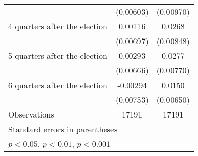 \begin{table}[htbp]
\begin{tabular}{l*{2}{c}}
                    &   (0.00603)         &   (0.00970)         \\
[1em]
 4 quarters after the election&     0.00116         &      0.0268\sym{**} \\
                    &   (0.00697)         &   (0.00848)         \\
[1em]
 5 quarters after the election&     0.00293         &      0.0277\sym{***}\\
                    &   (0.00666)         &   (0.00770)         \\
[1em]
 6 quarters after the election&    -0.00294         &      0.0150\sym{*}  \\
                    &   (0.00753)         &   (0.00650)         \\
\hline
Observations        &       17191         &       17191         \\
\hline\hline
\multicolumn{3}{l}{\footnotesize Standard errors in parentheses}\\
\multicolumn{3}{l}{\footnotesize \sym{*} \(p<0.05\), \sym{**} \(p<0.01\), \sym{***} \(p<0.001\)}\\
\end{tabular}
\end{table}

